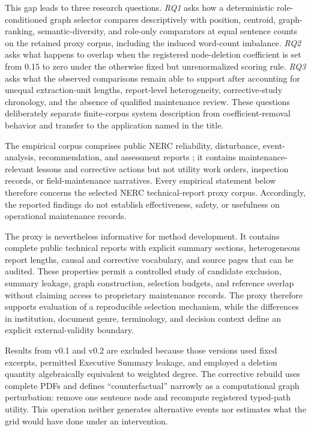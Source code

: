 \documentclass[applsci,article,submit,moreauthors]{Definitions/mdpi}
\begin{document}
This gap leads to three research questions. \textit{RQ1} asks how a deterministic role-conditioned graph selector compares descriptively with position, centroid, graph-ranking, semantic-diversity, and role-only comparators at equal sentence counts on the retained proxy corpus, including the induced word-count imbalance. \textit{RQ2} asks what happens to overlap when the registered node-deletion coefficient is set from 0.15 to zero under the otherwise fixed but unrenormalized scoring rule. \textit{RQ3} asks what the observed comparisons remain able to support after accounting for unequal extraction-unit lengths, report-level heterogeneity, corrective-study chronology, and the absence of qualified maintenance review. These questions deliberately separate finite-corpus system description from coefficient-removal behavior and transfer to the application named in the title.

The empirical corpus comprises public NERC reliability, disturbance, event-analysis, recommendation, and assessment reports \cite{nercEventAnalysis,nerc2015qualityreport}; it contains maintenance-relevant lessons and corrective actions but not utility work orders, inspection records, or field-maintenance narratives. Every empirical statement below therefore concerns the selected NERC technical-report proxy corpus. Accordingly, the reported findings do not establish effectiveness, safety, or usefulness on operational maintenance records.

The proxy is nevertheless informative for method development. It contains complete public technical reports with explicit summary sections, heterogeneous report lengths, causal and corrective vocabulary, and source pages that can be audited. These properties permit a controlled study of candidate exclusion, summary leakage, graph construction, selection budgets, and reference overlap without claiming access to proprietary maintenance records. The proxy therefore supports evaluation of a reproducible selection mechanism, while the differences in institution, document genre, terminology, and decision context define an explicit external-validity boundary.

Results from v0.1 and v0.2 are excluded because those versions used fixed excerpts, permitted Executive Summary leakage, and employed a deletion quantity algebraically equivalent to weighted degree. The corrective rebuild uses complete PDFs and defines ``counterfactual'' narrowly as a computational graph perturbation: remove one sentence node and recompute registered typed-path utility. This operation neither generates alternative events nor estimates what the grid would have done under an intervention.
\end{document}
